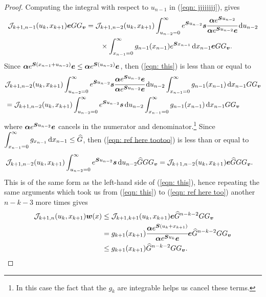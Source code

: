 \begin{proof}
	Computing the integral with respect to \(u_{n-1}\) in (\ref{eqn: jjjjjjjj}), gives
	\begin{align}
		\mathcal J_{k+1,n-1}(u_k,x_{k+1})  \boldsymbol e G  G_{\boldsymbol v} \nonumber 
		&= \mathcal J_{k+1,n-2}(u_k,x_{k+1}) \int_{u_{n-2}=0}^\infty e^{\boldsymbol{S}u_{n-2}}\boldsymbol s \cfrac{\boldsymbol \alpha e^{\boldsymbol{S}u_{n-2}}}{\boldsymbol \alpha e^{\boldsymbol{S}u_{n-2}}\boldsymbol e}\, \mathrm{d} u_{n-2} 
		\\&\qquad {} \times \int_{x_{n-1}=0}^\infty g_{n-1}(x_{n-1}) e^{\boldsymbol{S}x_{n-1}} \, \mathrm{d} x_{n-1} \boldsymbol e  
		GG_{\boldsymbol v}.\label{eqn: this}
	\end{align}
	Since \(\boldsymbol\alpha e^{\boldsymbol{S}(x_{n-1}+u_{n-2})}\boldsymbol e\leq  \boldsymbol\alpha e^{\boldsymbol{S}(u_{n-2})}\boldsymbol e\), then (\ref{eqn: this}) is less than or equal to 
	\begin{align}
		&\mathcal J_{k+1,n-2}(u_k,x_{k+1}) \int_{u_{n-2}=0}^\infty e^{\boldsymbol{S}u_{n-2}}\boldsymbol s \cfrac{\boldsymbol \alpha e^{\boldsymbol{S}u_{n-2}}\boldsymbol e}{\boldsymbol \alpha e^{\boldsymbol{S}u_{n-2}}\boldsymbol e}\, \mathrm{d} u_{n-2}  \int_{x_{n-1}=0}^\infty g_{n-1}(x_{n-1}) \, \mathrm{d} x_{n-1}  G  G_{\boldsymbol v} \nonumber 
		\\&= \mathcal J_{k+1,n-2}(u_k,x_{k+1}) \int_{u_{n-2}=0}^\infty e^{\boldsymbol{S}u_{n-2}}\boldsymbol s \, \mathrm{d} u_{n-2}  \int_{x_{n-1}=0}^\infty g_{n-1}(x_{n-1}) \, \mathrm{d} x_{n-1}  G  G_{\boldsymbol v} \label{eqn: ref here tootoo}
	\end{align} 
	where \(\boldsymbol \alpha e^{\boldsymbol{S}u_{n-2}}\boldsymbol e\) cancels in the numerator and denominator.\footnote{In this case the fact that the \(g_{k}\) are integrable helps us cancel these terms. } 
	Since \(\displaystyle \int_{x_{n-1}=0}^\infty g_{x_{n-1}} \, \mathrm{d} x_{n-1}\leq \widehat G\), then (\ref{eqn: ref here tootoo}) is less than or equal to
	\begin{align}
		\mathcal J_{k+1,n-2}(u_k,x_{k+1}) \int_{u_{n-2}=0}^\infty e^{\boldsymbol{S}u_{n-2}}\boldsymbol s \, \mathrm{d} u_{n-2} \widehat G G G_{\boldsymbol v}
		&= \mathcal J_{k+1,n-2}(u_k,x_{k+1}) \boldsymbol e \widehat G G G_{\boldsymbol v}. \label{eqn: ref here too}
	\end{align} 
	This is of the same form as the left-hand side of (\ref{eqn: this}), hence repeating the same arguments which took us from (\ref{eqn: this}) to (\ref{eqn: ref here too}) another \(n-k-3\) more times gives
	 \begin{align*}
		\mathcal J_{k+1,n}(u_k,x_{k+1}) \boldsymbol w(x)
		&\leq \mathcal J_{k+1,k+1}(u_k,x_{k+1}) \boldsymbol e  \widehat G^{n-k-2}G G_{\boldsymbol v}
		\\&= g_{k+1}(x_{k+1}) \cfrac{\boldsymbol\alpha e^{\boldsymbol{S}(u_k+x_{k+1})}}{\boldsymbol \alpha e^{\boldsymbol{S}u_k}\boldsymbol e} \boldsymbol e\widehat G^{n-k-2}G G_{\boldsymbol v}
		\\& \leq g_{k+1}(x_{k+1}) \widehat G^{n-k-2}G G_{\boldsymbol v}.
	\end{align*} 


\end{proof}

